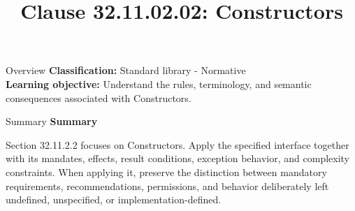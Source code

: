 \documentclass[10pt,letterpaper]{article}
\title{Clause 32.11.02.02: Constructors}
\author{}
\date{}
\begin{document}
\maketitle
\begin{CornellOverviewBox}{Overview}
\textbf{Classification:} Standard library - Normative\\[2pt]
\textbf{Learning objective:} Understand the rules, terminology, and semantic consequences associated with Constructors.
\end{CornellOverviewBox}\begin{CornellSummaryBox}{Summary}
{\sffamily\bfseries\color{Accent} Summary}\par\vspace{3pt}Section 32.11.2.2 focuses on Constructors. Apply the specified interface together with its mandates, effects, result conditions, exception behavior, and complexity constraints. When applying it, preserve the distinction between mandatory requirements, recommendations, permissions, and behavior deliberately left undefined, unspecified, or implementation-defined.
\end{CornellSummaryBox}
\end{document}
